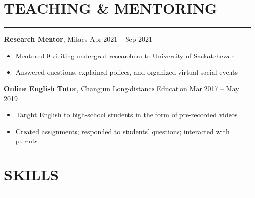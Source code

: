 \documentclass[a4paper, 11pt]{article}  %
\begin{document}
\section*{TEACHING \& MENTORING }
\hrule 
\vspace{11pt}

\textbf{Research Mentor}, Mitacs \hfill Apr 2021 – Sep 2021
\begin{itemize}
	\itemsep0em 
	
	\item{Mentored 9 visiting undergrad researchers to University of Saskatchewan}
	\item{Answered questions, explained polices, and organized virtual social events}
	
\end{itemize}

\vspace{11pt}

\noindent
\textbf{Online English Tutor}, Changjun Long-distance Education \hfill Mar 2017 – May 2019 
\begin{itemize}
	\itemsep0em 
	
	\item{Taught English to high-school students in the form of pre-recorded videos}
	\item{Created assignments; responded to students’ questions; interacted with parents}
	
\end{itemize}

\section*{SKILLS}
\hrule 
\vspace{11pt}
\end{document}
